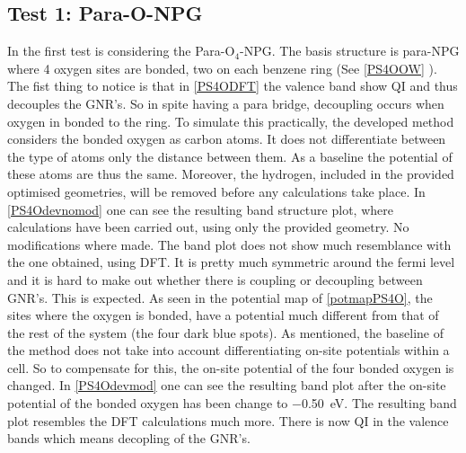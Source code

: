\subsection{Test 1: Para-O-NPG}
In the first test is considering the Para-O\(_4\)-NPG. The basis structure is para-NPG where 4 oxygen sites are bonded, two on each benzene ring (See \cref{PS4OOW} ). The fist thing to notice is that in \cref{PS4ODFT} the valence band show QI and thus decouples the GNR's. So in spite having a para bridge, decoupling occurs when oxygen in bonded to the ring. To simulate this practically, the developed method considers the bonded oxygen as carbon atoms. It does not differentiate between the type of atoms only the distance between them. As a baseline the potential of these atoms are thus the same. Moreover, the hydrogen, included in the provided optimised geometries, will be removed before any calculations take place. In \cref{PS4Odevnomod} one can see the resulting band structure plot, where calculations have been carried out, using only the provided geometry. No modifications where made. The band plot does not show much resemblance with the one obtained, using DFT. It is pretty much symmetric around the fermi level and it is hard to make out whether there is coupling or decoupling between GNR's. This is expected. As seen in the potential map of \cref{potmapPS4O}, the sites where the oxygen is bonded, have a potential much different from that of the rest of the system (the four dark blue spots). As mentioned, the baseline of the method does not take into account differentiating on-site potentials within a cell. So to compensate for this, the on-site potential of the four bonded oxygen is changed. In \cref{PS4Odevmod} one can see the resulting band plot after the on-site potential of the bonded oxygen has been change to \SI{-0.50}{\electronvolt}. The resulting band plot resembles the DFT calculations much more. There is now QI in the valence bands which means decopling of the GNR's.
